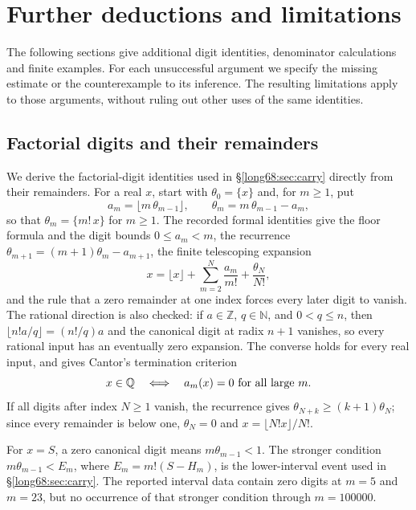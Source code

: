 \documentclass[11pt]{article}
\begin{document}
\section{Further deductions and limitations}\label{long68:sec:extended-record}

The following sections give additional digit identities, denominator
calculations and finite examples. For each unsuccessful argument we
specify the missing estimate or the counterexample to its inference.
The resulting limitations apply to those arguments, without ruling out
other uses of the same identities.

\subsection{Factorial digits and their remainders}\label{long68:sec:ext-digits}

We derive the factorial-digit identities used in
\S\ref{long68:sec:carry} directly from their remainders. For a real
$x$, start with $\theta_0=\{x\}$ and, for $m\ge1$, put
\[
 a_m=\lfloor m\,\theta_{m-1}\rfloor,\qquad \theta_m=m\,\theta_{m-1}-a_m ,
\]
so that $\theta_m=\{m!\,x\}$ for $m\ge1$.  The recorded formal identities give the floor
formula and the digit bounds $0\le a_m<m$, the recurrence
$\theta_{m+1}=(m+1)\theta_m-a_{m+1}$, the finite telescoping expansion
\[
 x=\lfloor x\rfloor+\sum_{m=2}^{N}\frac{a_m}{m!}+\frac{\theta_N}{N!},
\]
and the rule that a zero remainder at one index forces every later digit to
vanish.  The rational direction is also checked: if $a\in\mathbb Z$, $q\in\mathbb N$, and $0<q\le n$, then
$\lfloor n!a/q\rfloor=(n!/q)a$ and the canonical digit at
radix $n+1$ vanishes, so every rational input has an eventually zero
expansion.  The converse holds for every real input, and gives Cantor's
termination criterion \cite{cantor1869}
\[
 x\in\Q\quad\Longleftrightarrow\quad a_m(x)=0\ \hbox{for all large }m .
\]
If all digits after index $N\ge1$ vanish, the recurrence gives
$\theta_{N+k}\ge(k+1)\theta_N$; since every remainder is below one,
$\theta_N=0$ and $x=\lfloor N!x\rfloor/N!$.

For $x=S$, a zero canonical digit means $m\theta_{m-1}<1$. The
stronger condition $m\theta_{m-1}<E_m$, where $E_m=m!(S-H_m)$, is the
lower-interval event used in \S\ref{long68:sec:carry}. The reported interval
data contain zero digits at $m=5$ and $m=23$, but no occurrence of that
stronger condition through $m=100000$.
\end{document}
